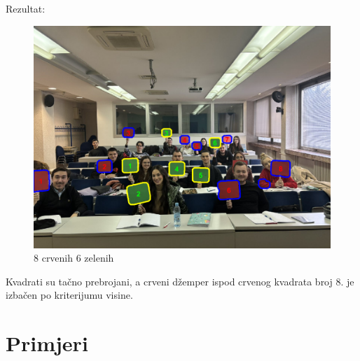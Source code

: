 \documentclass[a4paper,12pt]{article}
\begin{document}

\newpage
Rezultat:

\begin{figure}[h]
    \centering
    \includegraphics[width=\textwidth]{studenti.png}
    \caption{8 crvenih 6 zelenih}
    \label{fig:example}
\end{figure}

Kvadrati su tačno prebrojani, a crveni džemper ispod crvenog kvadrata broj 8. je izbačen po kriterijumu visine.

\newpage
\section{Primjeri}
\end{document}
